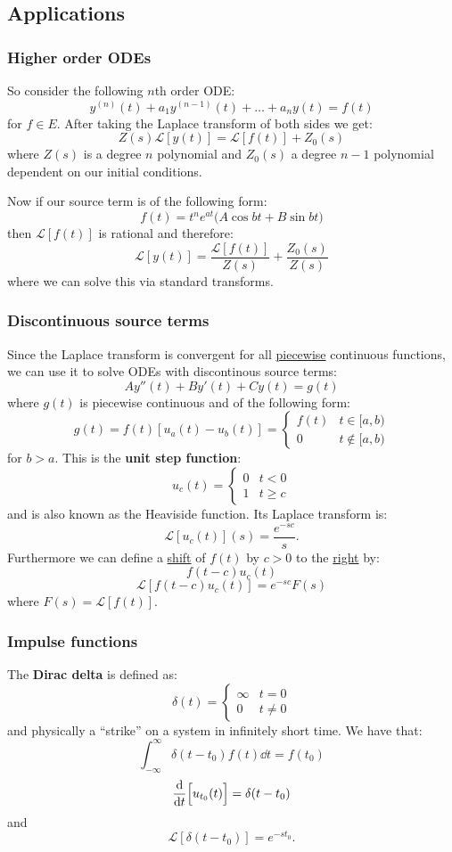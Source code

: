 \documentclass{article}
\begin{document}
\subsection{Applications}

\subsubsection{Higher order ODEs}
So consider the following $n$th order ODE:
$$y^{(n)}(t)+a_1y^{(n-1)}(t)+\dots
+a_n y(t)=f(t)$$
for $f\in E$. After taking the Laplace transform of both sides
we get:
$$Z(s)\mathcal{L}[y(t)]
=\mathcal{L}[f(t)]+Z_0(s)$$
where $Z(s)$ is a degree $n$ polynomial
and $Z_0(s)$ a degree $n-1$ polynomial dependent on our 
initial conditions.

Now if our source term is of the following form:
$$f(t)=t^n e^{at}\bigl(A\cos bt+B\sin bt\bigr)$$
then $\mathcal{L}[f(t)]$ is rational and therefore:
$$\mathcal{L}[y(t)]=\frac{\mathcal{L}[f(t)]}{Z(s)}+\frac{Z_0(s)}{Z(s)}$$
where we can solve this via standard transforms.

\newpage

\subsubsection{Discontinuous source terms}
Since the Laplace transform is convergent for all \underline{piecewise}
continuous functions, we can use it to solve ODEs with 
discontinous source terms:
$$Ay''(t)+By'(t)+Cy(t)=g(t)$$
where $g(t)$ is piecewise continuous and of the following form:
$$g(t)=f(t)[u_a(t)-u_b(t)]
=\left\{
    \begin{array}{lr}
        f(t) & t\in[a,b) \\
        0 & t\notin[a,b)
    \end{array}
\right.$$
for $b>a$. This is the \textbf{unit step function}:
$$u_c(t)=\left\{
    \begin{array}{lr}
        0 & t<0 \\
        1 & t\geq c
    \end{array}
\right.$$
and is also known as the Heaviside function. Its Laplace transform is:
$$\mathcal{L}[u_c(t)](s)=\frac{e^{-sc}}{s}.$$
Furthermore we can define a \underline{shift} of $f(t)$ by $c>0$ to the 
\underline{right} by:
$$f(t-c)u_c(t)$$
$$\mathcal{L}[f(t-c)u_c(t)]=e^{-sc}F(s)$$
where $F(s)=\mathcal{L}[f(t)]$.

\subsubsection{Impulse functions}
The \textbf{Dirac delta} is defined as:
$$\delta(t)=\left\{
    \begin{array}{lr}
        \infty & t=0 \\
        0 & t\neq0
    \end{array}
\right.$$
and physically a ``strike'' on a system
in infinitely short time.
We have that:
$$\int_{-\infty}^{\infty}\delta(t-t_0)
f(t)\dd t=f(t_0)$$
$$\dv{t}\Bigl[u_{t_0}(t)\Bigr]
=\delta(t-t_0)$$
and
$$\mathcal{L}[\delta(t-t_0)]
=e^{-st_0}.$$
\end{document}
